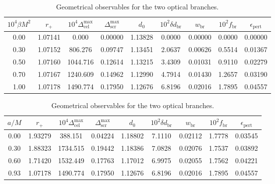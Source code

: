 \begin{table}[t]
\centering
\caption{Geometrical observables for the two optical branches.}
\begin{tabular}{ccccccccc}
\hline
$10^4\beta M^2$ & $r_+$ & $10^4\Delta_{\mathrm{cel}}^{\max}$ & $\Delta_{\mathrm{scr}}^{\max}$ & $d_0$ & $10^2\delta d_{\mathrm{br}}$ & $w_{\mathrm{br}}$ & $10^2 f_{\mathrm{br}}$ & $\epsilon_{\mathrm{pert}}$ \\
\hline
0.00 & 1.07141 & 0.000 & 0.00000 & 1.13828 & 0.0000 & 0.00000 & 0.0000 & 0.00000 \\
0.30 & 1.07152 & 806.276 & 0.09747 & 1.13451 & 2.0637 & 0.00626 & 0.5514 & 0.01367 \\
0.50 & 1.07160 & 1044.716 & 0.12614 & 1.13215 & 3.4309 & 0.01031 & 0.9110 & 0.02279 \\
0.70 & 1.07167 & 1240.609 & 0.14962 & 1.12990 & 4.7914 & 0.01430 & 1.2657 & 0.03190 \\
1.00 & 1.07178 & 1490.774 & 0.17950 & 1.12676 & 6.8196 & 0.02016 & 1.7895 & 0.04557 \\
\hline
\end{tabular}
\end{table}

\begin{table}[t]
\centering
\caption{Geometrical observables for the two optical branches.}
\begin{tabular}{ccccccccc}
\hline
$a/M$ & $r_+$ & $10^4\Delta_{\mathrm{cel}}^{\max}$ & $\Delta_{\mathrm{scr}}^{\max}$ & $d_0$ & $10^2\delta d_{\mathrm{br}}$ & $w_{\mathrm{br}}$ & $10^2 f_{\mathrm{br}}$ & $\epsilon_{\mathrm{pert}}$ \\
\hline
0.00 & 1.93279 & 388.151 & 0.04224 & 1.18802 & 7.1110 & 0.02112 & 1.7778 & 0.03545 \\
0.30 & 1.88323 & 1734.515 & 0.19442 & 1.18386 & 7.0828 & 0.02076 & 1.7537 & 0.03892 \\
0.60 & 1.71420 & 1532.449 & 0.17763 & 1.17012 & 6.9975 & 0.02055 & 1.7562 & 0.04221 \\
0.93 & 1.07178 & 1490.774 & 0.17950 & 1.12676 & 6.8196 & 0.02016 & 1.7895 & 0.04557 \\
\hline
\end{tabular}
\end{table}

